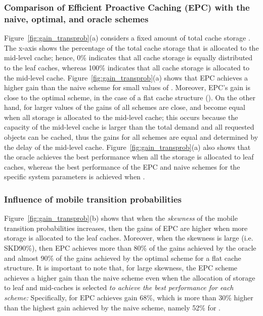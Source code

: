 \documentclass[conference]{IEEEtran}
\newcommand{\mynotex}[1]{}
\begin{document}
\subsubsection{Comparison of Efficient Proactive Caching (EPC)  with the naive, optimal, and oracle schemes} Figure~\ref{fig:gain_transprob}(a) considers a fixed amount of  total  cache storage . The x-axis shows the percentage  of the total cache storage that is allocated to the mid-level cache; hence, 0\% indicates that all cache storage is equally distributed to the leaf caches, whereas 100\% indicates that all cache storage is allocated to the mid-level cache.
Figure~\ref{fig:gain_transprob}(a) shows that  EPC achieves a higher gain than the naive scheme for small values of . Moreover, EPC's gain is close to the optimal scheme, in the case of a flat cache structure (). On the other hand, for larger values of   the gains of all schemes are close, and become equal when all storage is allocated to the mid-level cache; this occurs because the capacity of the mid-level cache is larger than the total demand and all requested objects can be cached, thus the gains for all schemes are equal and determined by the delay  of the mid-level cache.
Figure~\ref{fig:gain_transprob}(a) also shows that the oracle achieves the best performance when all the  storage is allocated to leaf caches, whereas the best performance of the EPC and naive schemes for the specific system parameters is achieved when .

\mynotex{
\begin{itemize}
\item for different values of MB/TC
\item mention differences in percentage
\item mention performance of eql close to naive.
\item naive: independent of trans probs
\item oracle: also independent of trans probs
\end{itemize}
}

\subsubsection{Influence of mobile transition probabilities}
Figure~\ref{fig:gain_transprob}(b) shows that when the \emph{skewness} of the mobile transition probabilities increases, then the gains of  EPC are higher when more storage is allocated to the leaf caches.
Moreover,  when the skewness is large (i.e. SKD90\%), then  EPC achieves more than 80\% of the gains achieved by the oracle and almost 90\% of the gains achieved by the optimal scheme for a flat cache structure.
It is important to note that, for large skewness, the EPC scheme achieves  a higher gain than the naive scheme even when the allocation of storage to leaf and mid-caches is selected \emph{to achieve the best performance for each scheme:} Specifically, for   EPC  achieves  gain 68\%, which is more than 30\% higher than the highest gain achieved by the naive scheme, namely 52\% for .
\end{document}
